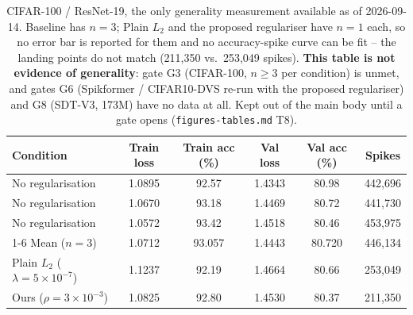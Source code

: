 \begin{table}
\centering
\small
\begin{tabular}{lccccc}
\toprule
Condition & Train loss & Train acc (\%) & Val loss & Val acc (\%) & Spikes \\
\midrule
No regularisation & 1.0895 & 92.57 & 1.4343 & 80.98 & 442,696 \\
No regularisation & 1.0670 & 93.18 & 1.4469 & 80.72 & 441,730 \\
No regularisation & 1.0572 & 93.42 & 1.4518 & 80.46 & 453,975 \\
\cmidrule{1-6}
Mean ($n=3$) & 1.0712 & 93.057 & 1.4443 & 80.720 & 446,134 \\
\midrule
Plain $L_2$ ($\lambda=5\times10^{-7}$) & 1.1237 & 92.19 & 1.4664 & 80.66 & 253,049 \\
\midrule
Ours ($\rho=3\times10^{-3}$) & 1.0825 & 92.80 & 1.4530 & 80.37 & 211,350 \\
\bottomrule
\end{tabular}
\caption{CIFAR-100 / ResNet-19, the only generality measurement available as of 2026-09-14. Baseline has $n=3$; Plain $L_2$ and the proposed regulariser have $n=1$ each, so no error bar is reported for them and no accuracy-spike curve can be fit -- the landing points do not match (211,350 vs.\ 253,049 spikes). \textbf{This table is not evidence of generality}: gate G3 (CIFAR-100, $n\geq3$ per condition) is unmet, and gates G6 (Spikformer / CIFAR10-DVS re-run with the proposed regulariser) and G8 (SDT-V3, 173M) have no data at all. Kept out of the main body until a gate opens (\texttt{figures-tables.md} T8).}
\label{tab:t8_generality}
\end{table}
